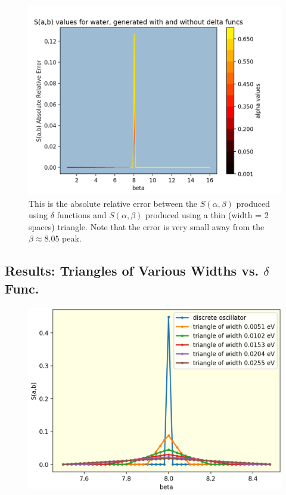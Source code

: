 \documentclass[Master.tex]{subfiles}
\begin{document}
            \begin{figure}[h]
              \begin{center}
              \includegraphics[scale=0.6]{sab_thinTriangle_error}
                \caption{This is the absolute relative error between the $S(\alpha,\beta)$ produced using $\delta$ functions and $S(\alpha,\beta)$ produced using a thin (width = 2 spaces) triangle. Note that the error is very small away from the $\beta\approx8.05$ peak. }
              \label{fig:sabThinTriangleError}
              \end{center}
            \end{figure}




\subsection*{Results: Triangles of Various Widths vs. $\delta$ Func.}

            \begin{figure}[h]
              \begin{center}
              \includegraphics[scale=0.6]{diff_widths_alpha_0p5}
                \caption{}
              \label{fig:diff_widths_alpha_0p5}
              \end{center}
            \end{figure}
\end{document}
